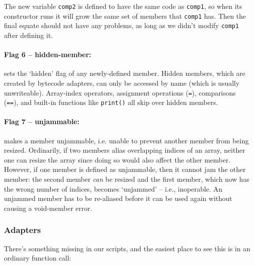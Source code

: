 \documentclass{article}
\begin{document}
\noindent The new variable \verb#comp2# is defined to have the same code as \verb#comp1#, so when its constructor runs it will grow the same set of members that \verb#comp1# has.  Then the final equate should not have any problems, as long as we didn't modify \verb#comp1# after defining it.\\


\paragraph{Flag 6 -- hidden-member:}  sets the `hidden' flag of any newly-defined member.  Hidden members, which are created by bytecode adapters, can only be accessed by name (which is usually unwriteable).  Array-index operators, assignment operations (\verb#=#), comparisons (\verb#==#), and built-in functions like \verb#print()# all skip over hidden members.\\


\paragraph{Flag 7 -- unjammable:} makes a member unjammable, i.e. unable to prevent another member from being resized.  Ordinarily, if two members alias overlapping indices of an array, neither one can resize the array since doing so would also affect the other member.  However, if one member is defined as unjammable, then it cannot jam the other member:  the second member \emph{can} be resized and the first member, which now has the wrong number of indices, becomes `unjammed' -- i.e., inoperable.  An unjammed member has to be re-aliased before it can be used again without causing a void-member error.\\




\subsubsection{Adapters}


There's something missing in our scripts, and the easiest place to see this is in an ordinary function call:
\end{document}
